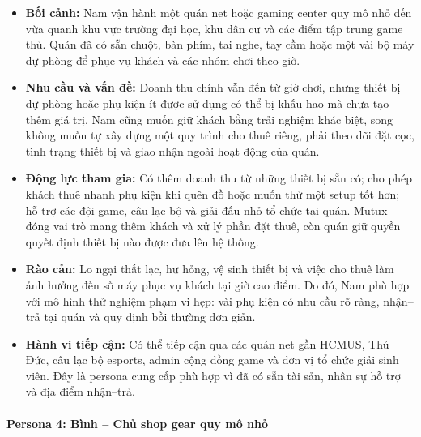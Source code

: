 \begin{itemize}
    \item \textbf{Bối cảnh:} Nam vận hành một quán net hoặc gaming center quy mô nhỏ đến vừa quanh khu vực trường đại học, khu dân cư và các điểm tập trung game thủ. Quán đã có sẵn chuột, bàn phím, tai nghe, tay cầm hoặc một vài bộ máy dự phòng để phục vụ khách và các nhóm chơi theo giờ.
    \item \textbf{Nhu cầu và vấn đề:} Doanh thu chính vẫn đến từ giờ chơi, nhưng thiết bị dự phòng hoặc phụ kiện ít được sử dụng có thể bị khấu hao mà chưa tạo thêm giá trị. Nam cũng muốn giữ khách bằng trải nghiệm khác biệt, song không muốn tự xây dựng một quy trình cho thuê riêng, phải theo dõi đặt cọc, tình trạng thiết bị và giao nhận ngoài hoạt động của quán.
    \item \textbf{Động lực tham gia:} Có thêm doanh thu từ những thiết bị sẵn có; cho phép khách thuê nhanh phụ kiện khi quên đồ hoặc muốn thử một setup tốt hơn; hỗ trợ các đội game, câu lạc bộ và giải đấu nhỏ tổ chức tại quán. Mutux đóng vai trò mang thêm khách và xử lý phần đặt thuê, còn quán giữ quyền quyết định thiết bị nào được đưa lên hệ thống.
    \item \textbf{Rào cản:} Lo ngại thất lạc, hư hỏng, vệ sinh thiết bị và việc cho thuê làm ảnh hưởng đến số máy phục vụ khách tại giờ cao điểm. Do đó, Nam phù hợp với mô hình thử nghiệm phạm vi hẹp: vài phụ kiện có nhu cầu rõ ràng, nhận--trả tại quán và quy định bồi thường đơn giản.
    \item \textbf{Hành vi tiếp cận:} Có thể tiếp cận qua các quán net gần HCMUS, Thủ Đức, câu lạc bộ esports, admin cộng đồng game và đơn vị tổ chức giải sinh viên. Đây là persona cung cấp phù hợp vì đã có sẵn tài sản, nhân sự hỗ trợ và địa điểm nhận--trả.
\end{itemize}

\paragraph{Persona 4: Bình -- Chủ shop gear quy mô nhỏ}

